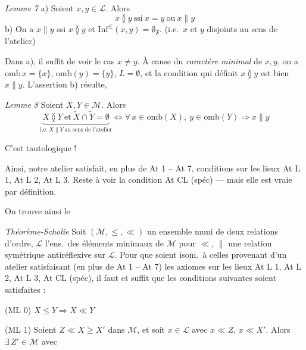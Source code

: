 \documentclass[11pt,a4paper]{article}
\begin{document}
\emph{Lemme 7} \struck{\ill{}} a) Soient $x, y \in \mathcal{L}$. Alors
\[
  x \between y \ \text{ssi}\ x = y \ \text{ou}\ x \parallel y
\]
b) On a $x \parallel y$ ssi $x \between y$ et $\mathrm{Inf}^{\leq}(x, y) = \emptyset_{\mathfrak{F}}$. (i.e.\ $x$ et $y$ disjoints au sens de l'atelier)

Dans a), il suffit de voir le cas $x \neq y$. À cause du \emph{caractère minimal} de $x, y$, on a $\mathrm{omb}\, x = \lbrace x \rbrace$, $\mathrm{omb}(y) = \lbrace y \rbrace$, $L = \emptyset$, et la condition  qui définit $x \between y$ est bien $x \parallel y$. L'assertion b) résulte,

\emph{Lemme 8} Soient $X, Y \in \mathcal{M}$. Alors
\[
  \underbrace{X \between Y \ \text{et}\ \widetilde{X} \cap \widetilde{Y} = \emptyset}_{\text{i.e.}\ X \parallel Y \ \text{au sens de l'atelier}}
  \iff \forall\, x \in \mathrm{omb}(X),\ y \in \mathrm{omb}(Y) \Longrightarrow x \parallel y
\]

C'est tautologique !

 Ainsi, notre atelier satisfait, en plus de At 1 -- At 7,  conditions sur les lieux At L 1, At L 2, At L 3. Reste à voir la condition At CL (spéc) --- mais elle est vraie par définition.

On trouve ainsi le

\emph{Théorème-Scholie} Soit $(\mathcal{M}, \leq, \ll)$ un ensemble muni de deux relations d'ordre, $\mathcal{L}$ l'ens.\ des éléments minimaux de $\mathcal{M}$ pour $\ll$, $\parallel$ une relation symétrique antiréflexive sur $\mathcal{L}$. Pour que   soient isom.\ à celles provenant d'un atelier  satisfaisant  (en plus de At 1 -- At 7) les axiomes sur les lieux At L 1, At L 2, At L 3,  At CL (spéc), il faut et suffit que les conditions suivantes soient satisfaites :

(ML 0) \quad $X \leq Y \Longrightarrow X \ll Y$

(ML 1) \quad Soient $Z \ll X \geq X'$ dans $\mathcal{M}$, et soit $x \in \mathcal{L}$ avec $x \ll Z$, $x \ll X'$. Alors $\exists\, Z' \in \mathcal{M}$ avec

\end{document}
